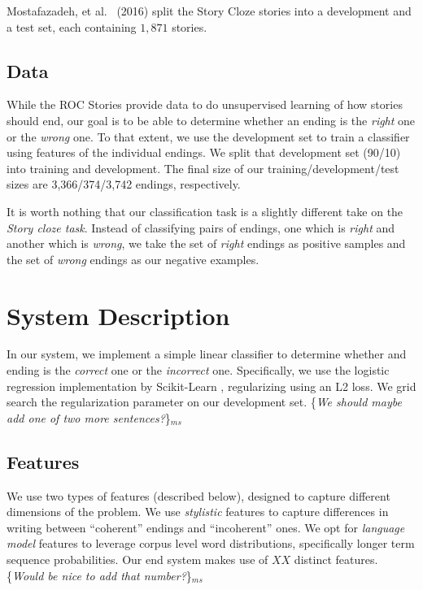 \documentclass[11pt]{article}
\newcommand{\ms}[1]{{\color{cyan}\{\textit{#1}\}$_{ms}$}}
\begin{document}
Mostafazadeh, et al. ~(2016)\nocite{Mostafazadeh:2016} split the Story Cloze stories into a development and a test set, each containing $1,871$ stories.

\subsection{Data}
While the ROC Stories provide data to do unsupervised learning of how stories should end, our goal is to be able to determine whether an ending is the \textit{right} one or the \textit{wrong} one. To that extent, we use the development set to train a classifier using features of the individual endings. We split that development set (90/10) into training and development.
The final size of our training/development/test sizes are 3,366/374/3,742 endings, respectively. 

It is worth nothing that our classification task is a slightly different take on the {\it Story cloze task}. 
Instead of classifying pairs of endings, one which is {\it right} and another which is {\it wrong}, we take the set of  {\it right} endings as positive samples and the set of {\it wrong} endings as our negative examples. 


\section{System Description}
In our system, we implement a simple linear classifier to determine whether and ending is the \textit{correct} one or the \textit{incorrect} one.
Specifically, we use the logistic regression implementation by Scikit-Learn \cite{sklearn}, regularizing using an L2 loss.
We grid search the regularization parameter on our development set. 
\ms{We should maybe add one of two more sentences?}

\subsection{Features}
We use two types of features (described below), designed to capture different dimensions of the problem. We use \textit{stylistic} features to capture differences in writing between ``coherent'' endings and ``incoherent'' ones. We opt for \textit{language model} features to leverage corpus level word distributions, specifically longer term sequence probabilities.
Our end system makes use of $XX$ distinct features. \ms{Would be nice to add that number?}
\end{document}
